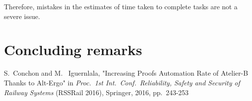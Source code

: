 \documentclass[11pt,journal]{IEEEtran}
\begin{document}
	Therefore, mistakes in the estimates of time taken to complete tasks are not a severe issue.
	
	\section{Concluding remarks}
	
	\IEEEPARstart{}{} 
	
	\begin{thebibliography}{1}
		S.~Conchon and M.~ Iguernlala, "Increasing Proofs Automation Rate	of Atelier-B Thanks to Alt-Ergo" in \emph{Proc.~1st Int.~Conf.~Reliability, Safety and Security of Railway Systems} (RSSRail 2016), Springer, 2016, pp.~243-253
		
		
	\end{thebibliography}
	
\end{document}
